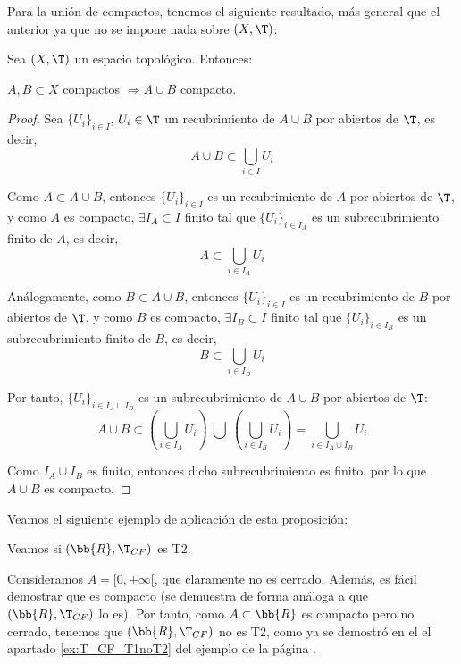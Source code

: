 Para la unión de compactos, tenemos el siguiente resultado, más general que el anterior ya que no se impone nada sobre $(X,\T)$:
\begin{prop} \label{prop:UnionCompactos}
    Sea $(X,\T)$ un espacio topológico. Entonces:
    \begin{center}
        $A,B\subset X$ compactos $\Longrightarrow A\cup B$ compacto.
    \end{center}
\end{prop}
\begin{proof}
    Sea $\{U_i\}_{i\in I}$, $U_i\in \T$ un recubrimiento de $A\cup B$ por abiertos de $\T$, es decir,
    \begin{equation*}
        A\cup B \subset \bigcup_{i\in I}U_i
    \end{equation*}

    Como $A\subset A\cup B$, entonces $\{U_i\}_{i\in I}$ es un recubrimiento de $A$ por abiertos de $\T$, y como $A$ es compacto, $\exists I_A\subset I$ finito tal que $\{U_i\}_{i\in I_A}$ es un subrecubrimiento finito de $A$,
    es decir,
    \begin{equation*}
        A \subset \bigcup_{i\in I_A}U_i
    \end{equation*}

    Análogamente, como $B\subset A\cup B$, entonces $\{U_i\}_{i\in I}$ es un recubrimiento de $B$ por abiertos de $\T$, y como $B$ es compacto, $\exists I_B\subset I$ finito tal que $\{U_i\}_{i\in I_B}$ es un subrecubrimiento finito de $B$,
    es decir,
    \begin{equation*}
        B \subset \bigcup_{i\in I_B}U_i
    \end{equation*}

    Por tanto, $\{U_i\}_{i\in I_A\cup I_B}$ es un subrecubrimiento de $A\cup B$ por abiertos de $\T$:
    \begin{equation*}
        A\cup B \subset \left(\bigcup_{i\in I_A}U_i\right) ~\bigcup~ \left(\bigcup_{i\in I_B}U_i\right) = \bigcup_{i\in I_A\cup I_B}U_i
    \end{equation*}

    Como $I_A\cup I_B$ es finito, entonces dicho subrecubrimiento es finito, por lo que $A\cup B$ es compacto.
\end{proof}


Veamos el siguiente ejemplo de aplicación de esta proposición:
\begin{ejemplo}
    Veamos si $(\bb{R},\T_{CF})$ es T2.
    
    Consideramos $A=[0,+\infty[$, que claramente no es cerrado. Además, es fácil demostrar que es compacto (se demuestra de forma análoga a que $(\bb{R},\T_{CF})$ lo es).
    Por tanto, como $A\subset \bb{R}$ es compacto pero no cerrado, tenemos que $(\bb{R},\T_{CF})$ no es T2, como ya se demostró en el el apartado \ref{ex:T_CF_T1noT2} del ejemplo de la página \pageref{ex:T_CF_T1noT2}.
\end{ejemplo}


